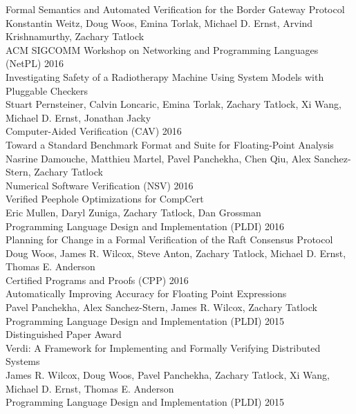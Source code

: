 \documentclass[10pt]{article}
\begin{document}
Formal Semantics and Automated Verification for the Border Gateway Protocol \\
Konstantin Weitz, Doug Woos, Emina Torlak, Michael D. Ernst, Arvind Krishnamurthy, Zachary Tatlock \\
ACM SIGCOMM Workshop on Networking and Programming Languages (NetPL) 2016 \\

Investigating Safety of a Radiotherapy Machine Using System Models with Pluggable Checkers \\
Stuart Pernsteiner, Calvin Loncaric, Emina Torlak, Zachary Tatlock, Xi Wang, Michael D. Ernst, Jonathan Jacky \\
Computer-Aided Verification (CAV) 2016 \\

Toward a Standard Benchmark Format and Suite for Floating-Point Analysis \\
Nasrine Damouche, Matthieu Martel, Pavel Panchekha, Chen Qiu, Alex Sanchez-Stern, Zachary Tatlock \\
Numerical Software Verification (NSV) 2016 \\

Verified Peephole Optimizations for CompCert \\
Eric Mullen, Daryl Zuniga, Zachary Tatlock, Dan Grossman \\
Programming Language Design and Implementation (PLDI) 2016 \\

Planning for Change in a Formal Verification of the Raft Consensus Protocol \\
Doug Woos, James R. Wilcox, Steve Anton, Zachary Tatlock, Michael D. Ernst, Thomas E. Anderson \\
Certified Programs and Proofs (CPP) 2016 \\

Automatically Improving Accuracy for Floating Point Expressions \\
Pavel Panchekha, Alex Sanchez-Stern, James R. Wilcox, Zachary Tatlock \\
Programming Language Design and Implementation (PLDI) 2015 \\
Distinguished Paper Award \\

Verdi: A Framework for Implementing and Formally Verifying Distributed Systems \\
James R. Wilcox, Doug Woos, Pavel Panchekha, Zachary Tatlock, Xi Wang, Michael D. Ernst, Thomas E. Anderson \\
Programming Language Design and Implementation (PLDI) 2015 \\
\end{document}
